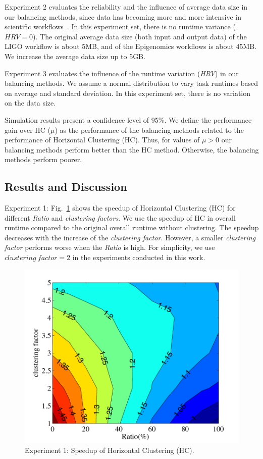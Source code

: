 \documentclass[final]{IEEEtran}
\begin{document}
Experiment 2 evaluates the reliability and the influence of average data size in our balancing methods, since data has becoming more and more intensive in scientific workflows~\cite{Juve2013}. In this experiment set, there is no runtime variance ($HRV = 0$). The original average data size (both input and output data) of the LIGO workflow is about 5MB, and of the Epigenomics workflows is about 45MB. We increase the average data size up to 5GB.

Experiment 3 evaluates the influence of the runtime variation (\emph{HRV}) in our balancing methods. We assume a normal distribution to vary task runtimes based on average and standard deviation. In this experiment set, there is no variation on the data size.

Simulation results present a confidence level of 95\%. We define the performance gain over HC ($\mu$) as the performance of the balancing methods related to the performance of Horizontal Clustering (HC). Thus, for values of $\mu > 0$ our balancing methods perform better than the HC method. Otherwise, the balancing methods perform poorer.

\subsection{Results and Discussion}

Experiment 1: Fig.~\ref{fig:shc} shows the speedup of Horizontal Clustering (HC) for different \emph{Ratio} and \emph{clustering factors}.  We use the speedup of HC in overall runtime compared to the original overall runtime without clustering. The speedup decreases with the increase of the \emph{clustering factor}. However, a smaller \emph{clustering factor} performs worse when the \emph{Ratio} is high. For simplicity, we use $clustering~factor=2$ in the experiments conducted in this work. 

\begin{figure}[htb]
	\centering
	\includegraphics[width=0.8\linewidth]{figure/cfactor.pdf}
	\caption{Experiment 1: Speedup of Horizontal Clustering (HC).}
	\label{fig:shc}
	\vspace{-10pt}
\end{figure}
\end{document}
